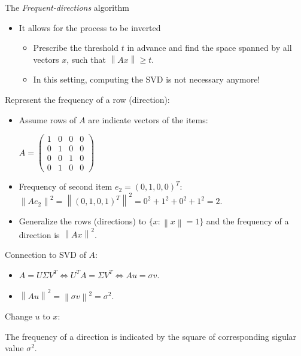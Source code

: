 \documentclass[first=dgreen,second=purple,logo=redque]{aaltoslides}
\newcommand{\vectornorm}[1]{\left\|#1\right\|}
\begin{document}
\begin{frame}[allowframebreaks=1]{The \textit{Frequent-directions} algorithm}
\begin{itemize}
  \item It allows for the process to be inverted
  \begin{itemize}
    \item Prescribe the threshold $t$ in advance and find the space spanned by all
vectors $x$, such that $\vectornorm{Ax} \geq t$.
    \item In this setting, computing the SVD is not necessary anymore!
   \end{itemize}
\end{itemize}

\framebreak
Represent the frequency of a row (direction):
\begin{itemize}
  \item Assume rows of $A$ are indicate vectors of the items: \\
  \begin{center}
  \vspace{2 mm}
  $A = \begin{pmatrix}
       1 & 0 & 0 & 0\\[0.3em] 
       0 & 1 & 0 & 0\\[0.3em]
       0 & 0 & 1 & 0\\[0.3em]
       0 & 1 & 0 & 0
     \end{pmatrix}$
  \end{center}
  \item Frequency of second item $e_2 = (0,1,0,0)^T$:
  $ \vectornorm{Ae_2}^2 = \vectornorm{(0,1,0,1)^T} ^2= 0^2 + 1^2 + 0^2 + 1^2 = 2$. 
  \item Generalize the rows (directions) to $\{x : \vectornorm{x}=1\} $ and the frequency of a direction is $\vectornorm{Ax}^2$.
\end{itemize}

\framebreak
Connection to SVD of $A$:
\begin{itemize}
  \item $A = U\Sigma V^T \Leftrightarrow U^TA = \Sigma V^T \Leftrightarrow Au = \sigma v$.
  \item $\vectornorm{Au}^2 = \vectornorm{\sigma v}^2 = \sigma^2$.
\end{itemize}
  \vspace{2 mm}
Change $u$ to $x$: \\
  \vspace{2 mm}

The frequency of a direction is indicated by the square of corresponding sigular value $\sigma^2$.


\end{frame}
\end{document}
